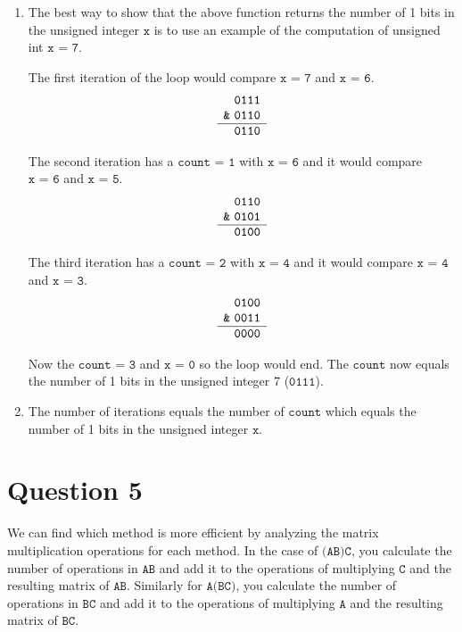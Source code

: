 \documentclass[11pt]{article}
\begin{document}
\begin{enumerate}
    \item The best way to show that the above function returns the number of 1 bits in the unsigned integer $\texttt{x}$ is to use an example of the computation of unsigned int $\texttt{x = 7}$.
    
    
    The first iteration of the loop would compare $\texttt{x = 7}$ and $\texttt{x = 6}$.
    \[\begin{array}[t]{r}
        \texttt{0111}\\
    \texttt{\&} \ \texttt{0110}\\ \hline
        \texttt{0110}
    \end{array}\]
    
    The second iteration has a $\texttt{count = 1}$ with $\texttt{x = 6}$ and it would compare $\texttt{x = 6}$ and $\texttt{x = 5}$.
    \[\begin{array}[t]{r}
        \texttt{0110}\\
    \texttt{\&} \ \texttt{0101}\\ \hline
        \texttt{0100}
    \end{array}\]
    
    The third iteration has a $\texttt{count = 2}$ with $\texttt{x = 4}$ and it would compare $\texttt{x = 4}$ and $\texttt{x = 3}$.
    \[\begin{array}[t]{r}
        \texttt{0100}\\
    \texttt{\&} \ \texttt{0011}\\ \hline
        \texttt{0000}
    \end{array}\]
    
    Now the $\texttt{count = 3}$ and $\texttt{x = 0}$ so the loop would end. The $\texttt{count}$ now equals the number of 1 bits in the unsigned integer 7 ($\texttt{0111}$).
    
    \item The number of iterations equals the number of $\texttt{count}$ which equals the number of 1 bits in the unsigned integer $\texttt{x}$.
\end{enumerate}

\section*{Question 5}
We can find which method is more efficient by analyzing the matrix multiplication operations for each method. In the case of $\texttt{(AB)C}$, you calculate the number of operations in $\texttt{AB}$ and add it to the operations of multiplying $\texttt{C}$ and the resulting matrix of $\texttt{AB}$. Similarly for $\texttt{A(BC)}$, you calculate the number of operations in $\texttt{BC}$ and add it to the operations of multiplying $\texttt{A}$ and the resulting matrix of $\texttt{BC}$.
\end{document}
